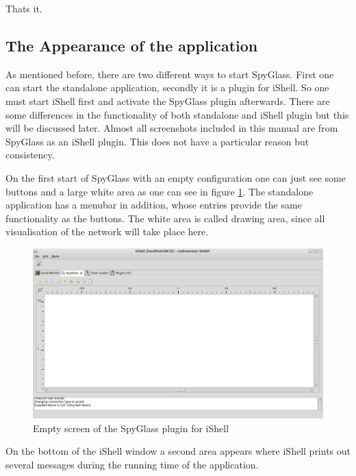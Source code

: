Thats it.

\subsection{The Appearance of the application}

As mentioned before, there are two different ways to start SpyGlass. First one can start the standalone application,
secondly it is a plugin for
iShell. So one must start iShell first and activate the SpyGlass plugin afterwards.
There are some differences in the functionality of both standalone and iShell plugin but this will be discussed later.
Almost all screenshots included in this manual are from SpyGlass as an iShell plugin. This does not have a particular reason
but consistency.

On the first start of SpyGlass with an empty configuration one can just see some buttons and a large white area as one
can see in figure \ref{pic:spyglass_first_appearance}.
The standalone application has a menubar in addition, whose entries provide the same functionality as the buttons. The white
area is called drawing area, since all visualisation of the network will take place here.

\begin{figure}[htb]
  \begin{center}
    \includegraphics[width=13.2cm]{./pics/spyglass_first_appearance}
    \caption{Empty screen of the SpyGlass plugin for iShell}
    \label{pic:spyglass_first_appearance}
  \end{center}
\end{figure}

On the bottom of the iShell window a second area appears where iShell prints out several messages during the
running time of the application.

